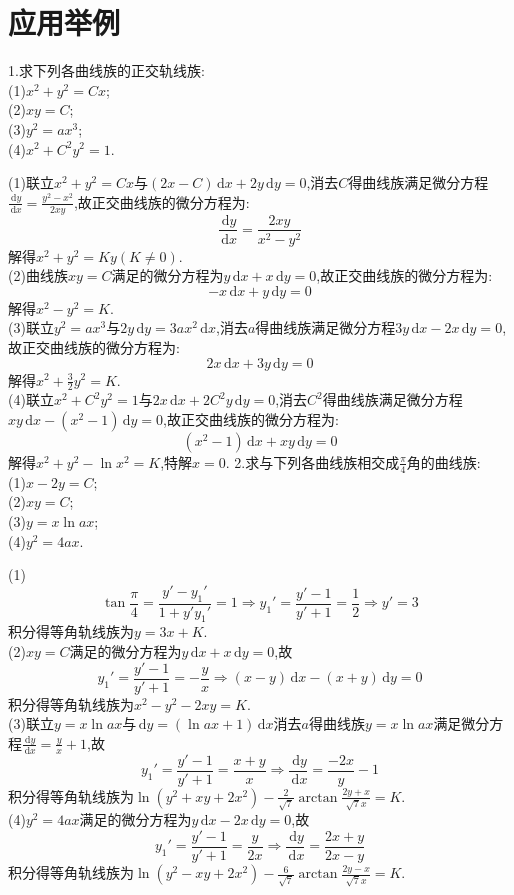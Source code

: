 \documentclass[titlepage,11pt,a4paper,twoside]{report}
\makeatletter
\newcommand\diff{\,\mathrm{d}}
\newenvironment{solve}{\par
	\pushQED{\qed}%
	\normalfont \topsep1\p@\@plus6\p@\relax
	\trivlist
	\item\relax
	{\hspace*{\parindent}{\heiti 解}\@addpunct{:}}\hspace\labelsep\ignorespaces
}{%
	\popQED\endtrivlist\@endpefalse
}
\makeatother
\begin{document}
\section{应用举例}
1.求下列各曲线族的正交轨线族:\\
(1)$x^2+y^2=Cx$;\\
(2)$xy=C$;\\
(3)$y^2=ax^3$;\\
(4)$x^2+C^2y^2=1$.
\begin{solve}
(1)联立$x^2+y^2=Cx$与$(2x-C)\diff x+2y\diff y=0$,消去$C$得曲线族满足微分方程$\frac{\diff y}{\diff x}=\frac{y^2-x^2}{2xy}$,故正交曲线族的微分方程为:
\[\frac{\diff y}{\diff x}=\frac{2xy}{x^2-y^2}\]
解得$x^2+y^2=Ky(K\neq0)$.\\
(2)曲线族$xy=C$满足的微分方程为$y\diff x+x\diff y=0$,故正交曲线族的微分方程为:
\[-x\diff x+y\diff y=0\]
解得$x^2-y^2=K$.\\
(3)联立$y^2=ax^3$与$2y\diff y=3ax^2\diff x$,消去$a$得曲线族满足微分方程$3y\diff x-2x\diff y=0$,故正交曲线族的微分方程为:
\[2x\diff x+3y\diff y=0\]
解得$x^2+\frac{3}{2}y^2=K$.\\
(4)联立$x^2+C^2y^2=1$与$2x\diff x+2C^2y\diff y=0$,消去$C^2$得曲线族满足微分方程$xy\diff x-(x^2-1)\diff y=0$,故正交曲线族的微分方程为:
\[(x^2-1)\diff x+xy\diff y=0\]
解得$x^2+y^2-\ln x^2=K$,特解$x=0$.
\end{solve}
2.求与下列各曲线族相交成$\frac{\pi}{4}$角的曲线族:\\
(1)$x-2y=C$;\\
(2)$xy=C$;\\
(3)$y=x\ln ax$;\\
(4)$y^2=4ax$.
\begin{solve}
(1)\[\tan\frac{\pi}{4}=\frac{y'-y_1'}{1+y'y_1'}=1\Rightarrow y_1'=\frac{y'-1}{y'+1}=\frac{1}{2}\Rightarrow y'=3\]
积分得等角轨线族为$y=3x+K$.\\
(2)$xy=C$满足的微分方程为$y\diff x+x\diff y=0$,故
\[y_1'=\frac{y'-1}{y'+1}=-\frac{y}{x}\Rightarrow(x-y)\diff x-(x+y)\diff y=0\]
积分得等角轨线族为$x^2-y^2-2xy=K$.\\
(3)联立$y=x\ln ax$与$\diff y=(\ln ax+1)\diff x$消去$a$得曲线族$y=x\ln ax$满足微分方程$\frac{\diff y}{\diff x}=\frac{y}{x}+1$,故
\[y_1'=\frac{y'-1}{y'+1}=\frac{x+y}{x}\Rightarrow\frac{\diff y}{\diff x}=\frac{-2x}{y}-1\]
积分得等角轨线族为$\ln(y^2+xy+2x^2)-\frac{2}{\sqrt{7}}\arctan\frac{2y+x}{\sqrt{7}x}=K$.\\
(4)$y^2=4ax$满足的微分方程为$y\diff x-2x\diff y=0$,故
\[y_1'=\frac{y'-1}{y'+1}=\frac{y}{2x}\Rightarrow\frac{\diff y}{\diff x}=\frac{2x+y}{2x-y}\]
积分得等角轨线族为$\ln(y^2-xy+2x^2)-\frac{6}{\sqrt{7}}\arctan\frac{2y-x}{\sqrt{7}x}=K$.
\end{solve}
\end{document}

